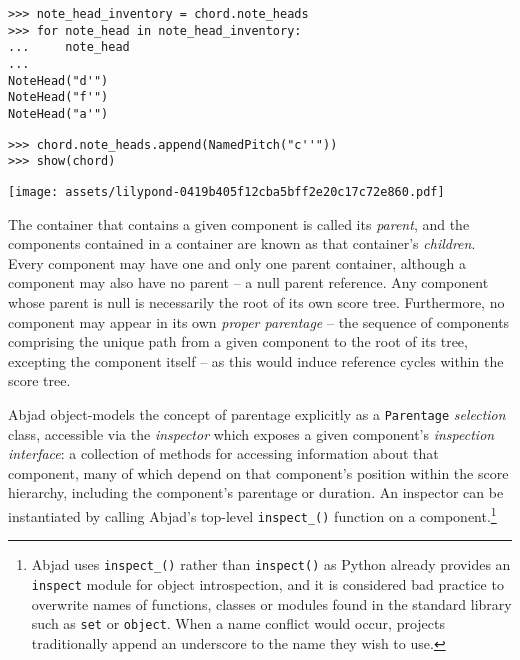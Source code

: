 \begin{comment}
<abjad>
note_head_inventory = chord.note_heads
for note_head in note_head_inventory:
    note_head

chord.note_heads.append(NamedPitch("c''"))
show(chord)
</abjad>
\end{comment}

\begin{abjadbookoutput}
\begin{singlespacing}
\vspace{-0.5\baselineskip}
\begin{lstlisting}
>>> note_head_inventory = chord.note_heads
>>> for note_head in note_head_inventory:
...     note_head
...
NoteHead("d'")
NoteHead("f'")
NoteHead("a'")
\end{lstlisting}
\begin{lstlisting}
>>> chord.note_heads.append(NamedPitch("c''"))
>>> show(chord)
\end{lstlisting}
\noindent\texttt{[image: assets/lilypond-0419b405f12cba5bff2e20c17c72e860.pdf]}
\end{singlespacing}
\end{abjadbookoutput}

The container that contains a given component is called its \emph{parent}, and
the components contained in a container are known as that container's
\emph{children}. Every component may have one and only one parent container,
although a component may also have no parent -- a null parent reference. Any
component whose parent is null is necessarily the root of its own score tree.
Furthermore, no component may appear in its own \emph{proper parentage} -- the
sequence of components comprising the unique path from a given component to the
root of its tree, excepting the component itself -- as this would induce
reference cycles within the score tree.

Abjad object-models the concept of parentage explicitly as a \texttt{Parentage}
\emph{selection} class, accessible via the \emph{inspector} which exposes a
given component's \emph{inspection interface}: a collection of methods for
accessing information about that component, many of which depend on that
component's position within the score hierarchy, including the component's
parentage or duration. An inspector can be instantiated by calling Abjad's
top-level \texttt{inspect\_()} function on a component.\footnote{Abjad uses
\texttt{inspect\_()} rather than \texttt{inspect()} as Python already provides
an \texttt{inspect} module for object introspection, and it is considered bad
practice to overwrite names of functions, classes or modules found in the
standard library such as \texttt{set} or \texttt{object}. When a name conflict
would occur, projects traditionally append an underscore to the name they wish
to use.}

